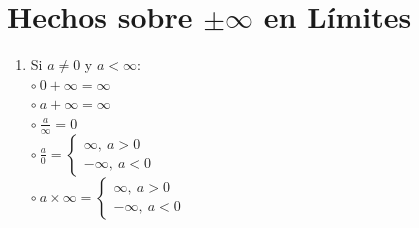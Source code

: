 \documentclass[12pt,a4paper]{article}
\begin{document}
    \section{\textcolor{violeta}{Hechos sobre $\pm\infty$ en Límites}}
    \begin{tcolorbox}[colback=white!5!white,colframe=violeta!75!black]
        \begin{multicols}{2}
            \begin{enumerate}
                \item Si $a\neq0 $ y $a<\infty$:\\
                $\circ\:0+\infty=\infty$\\
                $\circ\:a+\infty=\infty$\\
                $\circ\:\frac{a}{\infty}=0 $\\
                $\circ\:\frac{a}{0}=\left\lbrace\begin{array}{c}\infty,\:a>0\\-\infty,\:a<0\end {array} \right. $\\
                $\circ\:a\times\infty=\left\lbrace\begin{array}{c}\infty,\:a>0\\-\infty,\:a<0\end {array} \right. $
            \end{enumerate}            
        \end{multicols}
    \end{tcolorbox}
\end{document}
